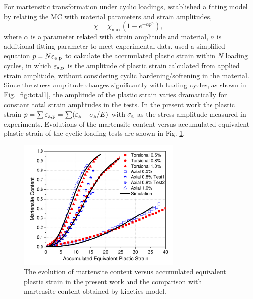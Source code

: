 \documentclass[preprint,5p,twocolumn,10pt,sort&compress]{elsarticle}
\newcommand{\marked}[1]{\textcolor{red}{#1}}
\begin{document}
For martensitic transformation under cyclic loadings, \cite{Smaga2008Deformation} established a fitting model by relating the MC with material parameters and strain amplitudes,
\begin{equation}\label{eq:Smaga model}
\chi =\chi _{\max}\left ( 1-e^{-\alpha p ^{n}} \right ),
\end{equation}
where $\alpha$ is a parameter related with strain amplitude and material, $n$ is additional fitting parameter to meet experimental data. \cite{Smaga2008Deformation} used a simplified equation $p= N { \varepsilon _{\rm a,p}}$ to calculate the accumulated plastic strain within $N$ loading cycles, in which $\varepsilon _{\rm a,p}$ is the amplitude of plastic strain calculated from applied strain amplitude, without considering cyclic hardening/softening in the material. Since the stress amplitude changes significantly with loading cycles, as shown in Fig. \ref{fig:total1}, the amplitude of the plastic strain varies dramatically for constant total strain amplitudes in the tests. In the present work the plastic strain $p=\sum \varepsilon _{\rm a,p}=\sum (\varepsilon_{\rm a} - \sigma_{\rm a}/E)$ with $\sigma_{\rm a}$ as the stress amplitude measured in experiments.
Evolutions of the martensite content versus accumulated equivalent plastic strain of the cyclic loading tests are shown in Fig. \ref{fig:EvolutionModel3}.

\begin{figure}[ht]
  \begin{center}
  \includegraphics[width=8cm]{EvolutionModel3.pdf}
  \caption{The evolution of martensite content versus accumulated equivalent plastic strain in the present work and the comparison with martensite content obtained by kinetics model.}
  \label{fig:EvolutionModel3}
  \end{center}
\end{figure}

\end{document}
